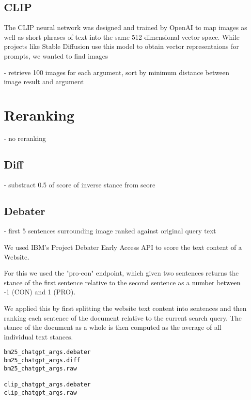 \documentclass[
]{ceurart}
\begin{document}
\subsection{CLIP}

The CLIP \cite{radford2021learning} neural network was designed and trained by OpenAI to map images as well as short phrases of text into the same 512-dimensional vector space. While projects like Stable Diffusion use this model to obtain vector representaions for prompts, we wanted to find images 

- retrieve 100 images for each argument, sort by minimum distance between image result and argument

\section{Reranking}

- no reranking

\subsection{Diff}

- substract 0.5 of score of inverse stance from score

\subsection{Debater}

- first 5 sentences surrounding image ranked against original query text

We used IBM's Project Debater Early Access API to score the text content of a Website.

For this we used the "pro-con" endpoint, which given two sentences returns the stance of the first sentence relative to the second sentence as a number between -1 (CON) and 1 (PRO).

We applied this by first splitting the website text content into sentences and then ranking each sentence of the document relative to the current search query. The stance of the document as a whole is then computed as the average of all individual text stances.

\begin{verbatim}
bm25_chatgpt_args.debater
bm25_chatgpt_args.diff
bm25_chatgpt_args.raw

clip_chatgpt_args.debater
clip_chatgpt_args.raw
\end{verbatim}


\end{document}
